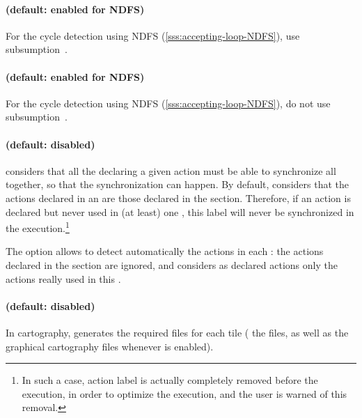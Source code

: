 \paragraph{ (default: enabled for NDFS)}
For the cycle detection using NDFS (\cref{sss:accepting-loop-NDFS}), use subsumption~\cite{NPP18}.


\paragraph{ (default: enabled for NDFS)}
For the cycle detection using NDFS (\cref{sss:accepting-loop-NDFS}), do not use subsumption~\cite{NPP18}.


\paragraph{ (default: disabled)}
\imitator{} considers that all the \IPTA{} declaring a given action must be able to synchronize all together, so that the synchronization can happen.
By default, \imitator{} considers that the actions declared in an \IPTA{} are those declared in the  section.
Therefore, if an action is declared but never used in (at least) one \IPTA{}, this label will never be synchronized in the execution.\footnote{In such a case, action label is actually completely removed before the execution, in order to optimize the execution, and the user is warned of this removal.}

The option  allows to detect automatically the actions in each \IPTA{}: the actions declared in the  section are ignored, and \imitator{} considers as declared actions only the actions really used in this \IPTA{}.



\paragraph{ (default: disabled)}
In cartography, generates the required files for each tile (\ie{} the  files, as well as the graphical cartography files whenever  is enabled).



